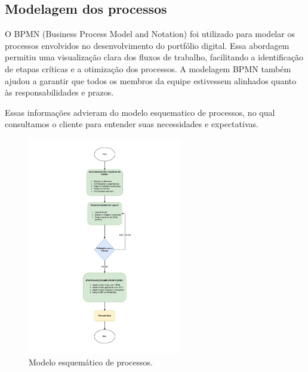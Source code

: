 
\subsection{Modelagem dos processos}

 O BPMN (Business Process Model and Notation) foi utilizado para modelar os processos envolvidos no desenvolvimento do portfólio digital. Essa abordagem permitiu uma visualização clara dos fluxos de trabalho, facilitando a identificação de etapas críticas e a otimização dos processos. A modelagem BPMN também ajudou a garantir que todos os membros da equipe estivessem alinhados quanto às responsabilidades e prazos.


Essas informações advieram do modelo esquematico de processos, no qual consultamos o cliente para entender suas necessidades e expectativas.

\begin{figure}[H]
    \centering
    \includegraphics[width=0.6\textwidth]{Figures/modelo_esquematico_de_processos..pdf} %
    \caption{Modelo esquemático de processos.}
    \label{fig:esquema}
\end{figure}




